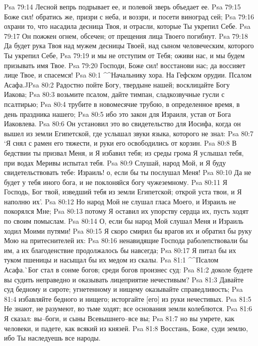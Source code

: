 Psa 79:14  Лесной вепрь подрывает ее, и полевой зверь объедает ее.
Psa 79:15  Боже сил! обратись же, призри с неба, и воззри, и посети виноград сей;
Psa 79:16  охрани то, что насадила десница Твоя, и отрасли, которые Ты укрепил Себе.
Psa 79:17  Он пожжен огнем, обсечен; от прещения лица Твоего погибнут.
Psa 79:18  Да будет рука Твоя над мужем десницы Твоей, над сыном человеческим, которого Ты укрепил Себе,
Psa 79:19  и мы не отступим от Тебя; оживи нас, и мы будем призывать имя Твое.
Psa 79:20  Господи, Боже сил! восстанови нас; да воссияет лице Твое, и спасемся!
Psa 80:1  ^^Начальнику хора. На Гефском орудии. Псалом Асафа.^^
Psa 80:2  Радостно пойте Богу, твердыне нашей; восклицайте Богу Иакова;
Psa 80:3  возьмите псалом, дайте тимпан, сладкозвучные гусли с псалтирью;
Psa 80:4  трубите в новомесячие трубою, в определенное время, в день праздника нашего;
Psa 80:5  ибо это закон для Израиля, устав от Бога Иаковлева.
Psa 80:6  Он установил это во свидетельство для Иосифа, когда он вышел из земли Египетской, где услышал звуки языка, которого не знал:
Psa 80:7  `Я снял с рамен его тяжести, и руки его освободились от корзин.
Psa 80:8  В бедствии ты призвал Меня, и Я избавил тебя; из среды грома Я услышал тебя, при водах Меривы испытал тебя.
Psa 80:9  Слушай, народ Мой, и Я буду свидетельствовать тебе: Израиль! о, если бы ты послушал Меня!
Psa 80:10  Да не будет у тебя иного бога, и не поклоняйся богу чужеземному.
Psa 80:11  Я Господь, Бог твой, изведший тебя из земли Египетской; открой уста твои, и Я наполню их'.
Psa 80:12  Но народ Мой не слушал гласа Моего, и Израиль не покорялся Мне;
Psa 80:13  потому Я оставил их упорству сердца их, пусть ходят по своим помыслам.
Psa 80:14  О, если бы народ Мой слушал Меня и Израиль ходил Моими путями!
Psa 80:15  Я скоро смирил бы врагов их и обратил бы руку Мою на притеснителей их:
Psa 80:16  ненавидящие Господа раболепствовали бы им, а их благоденствие продолжалось бы навсегда;
Psa 80:17  Я питал бы их туком пшеницы и насыщал бы их медом из скалы.
Psa 81:1  ^^Псалом Асафа.^^ Бог стал в сонме богов; среди богов произнес суд:
Psa 81:2  доколе будете вы судить неправедно и оказывать лицеприятие нечестивым?
Psa 81:3  Давайте суд бедному и сироте; угнетенному и нищему оказывайте справедливость;
Psa 81:4  избавляйте бедного и нищего; исторгайте [его] из руки нечестивых.
Psa 81:5  Не знают, не разумеют, во тьме ходят; все основания земли колеблются.
Psa 81:6  Я сказал: вы--боги, и сыны Всевышнего--все вы;
Psa 81:7  но вы умрете, как человеки, и падете, как всякий из князей.
Psa 81:8  Восстань, Боже, суди землю, ибо Ты наследуешь все народы.
